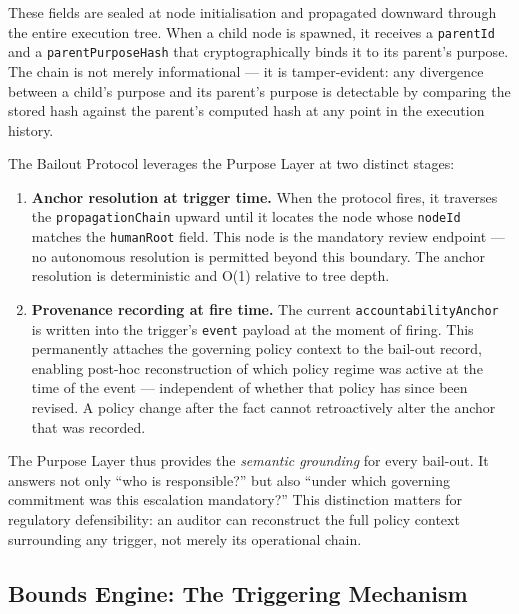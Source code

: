 These fields are sealed at node initialisation and propagated downward through
the entire execution tree.  When a child node is spawned, it receives a
\texttt{parentId} and a \texttt{parentPurposeHash} that cryptographically binds it
to its parent's purpose.  The chain is not merely informational — it is
tamper-evident: any divergence between a child's purpose and its parent's purpose
is detectable by comparing the stored hash against the parent's computed hash at
any point in the execution history.

The Bailout Protocol leverages the Purpose Layer at two distinct stages:

\begin{enumerate}
  \item \textbf{Anchor resolution at trigger time.}  When the protocol fires, it
        traverses the \texttt{propagationChain} upward until it locates the node
        whose \texttt{nodeId} matches the \texttt{humanRoot} field.  This node is the
        mandatory review endpoint — no autonomous resolution is permitted beyond
        this boundary.  The anchor resolution is deterministic and O(1) relative to
        tree depth.

  \item \textbf{Provenance recording at fire time.}  The current
        \texttt{accountabilityAnchor} is written into the trigger's \texttt{event}
        payload at the moment of firing.  This permanently attaches the governing
        policy context to the bail-out record, enabling post-hoc reconstruction of
        which policy regime was active at the time of the event — independent of
        whether that policy has since been revised.  A policy change after the fact
        cannot retroactively alter the anchor that was recorded.
\end{enumerate}

The Purpose Layer thus provides the \emph{semantic grounding} for every bail-out.
It answers not only ``who is responsible?'' but also ``under which governing
commitment was this escalation mandatory?''  This distinction matters for
regulatory defensibility: an auditor can reconstruct the full policy context
surrounding any trigger, not merely its operational chain.

\subsection{Bounds Engine: The Triggering Mechanism}

